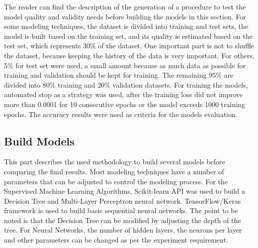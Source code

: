 The reader can find the description of the generation of a procedure to test the model quality and validity needs before building the models in this section. \newline \newline
For some modeling techniques, the dataset is divided into training and test sets, the model is built based on the training set, and its quality is estimated based on the test set, which represents 30\% of the dataset. \newline
One important part is not to shuffle the dataset, because keeping the history of the data is very important. \newline 
For others, 5\% for test set were used, a small amount because  as much data as possible for training and validation should be kept for training. The remaining 95\% are divided into 80\% training and 20\% validation datasets.\newline \newline
For training the models, automated stop as a strategy was used, after the training loss did not improve more than 0.0001 for 10 consecutive epochs or the model exceeds 1000 training epochs.\newline 
The accuracy results were used as criteria for the models evaluation.

\subsection{Build Models}

This part describes the used methodology to build several models before comparing the final results.\newline
Most modeling techniques have a number of parameters that can be adjusted to control the modeling process.\newline \newline
For the Supervised Machine Learning Algorithms, Scikit-learn API was used to build a Decision Tree and Multi-Layer Perceptron neural network. TensorFlow/Keras framework is used to build basic sequential neural networks.\newline \newline
The point to be noted is that the Decision Tree can be modified by adjusting the depth of the tree. For Neural Networks,  the number of hidden layers, the neurons per layer and other parameters can be changed as per the experiment requirement.



